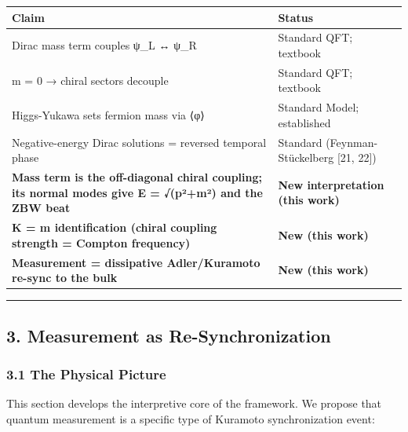 \documentclass[
]{article}
\newcounter{none} %
\begin{document}
{\def\LTcaptype{none} %
\begin{longtable}[]{@{}
  >{\raggedright\arraybackslash}p{}
  >{\raggedright\arraybackslash}p{}@{}}
\toprule\noalign{}
\begin{minipage}[b]{\linewidth}\raggedright
Claim
\end{minipage} & \begin{minipage}[b]{\linewidth}\raggedright
Status
\end{minipage} \\
\midrule\noalign{}
\endhead
\bottomrule\noalign{}
\endlastfoot
Dirac mass term couples ψ\_L ↔ ψ\_R & Standard QFT; textbook \\
m = 0 → chiral sectors decouple & Standard QFT; textbook \\
Higgs-Yukawa sets fermion mass via ⟨φ⟩ & Standard Model; established \\
Negative-energy Dirac solutions = reversed temporal phase & Standard
(Feynman-Stückelberg {[}21, 22{]}) \\
\textbf{Mass term is the off-diagonal chiral coupling; its normal modes
give E = √(p²+m²) and the ZBW beat} & \textbf{New interpretation (this
work)} \\
\textbf{K = m identification (chiral coupling strength = Compton
frequency)} & \textbf{New (this work)} \\
\textbf{Measurement = dissipative Adler/Kuramoto re-sync to the bulk} &
\textbf{New (this work)} \\
\end{longtable}
}

\begin{center}\rule{0.5\linewidth}{0.5pt}\end{center}

\subsection{3. Measurement as
Re-Synchronization}\label{measurement-as-re-synchronization}

\subsubsection{3.1 The Physical Picture}\label{the-physical-picture}

This section develops the interpretive core of the framework. We propose
that quantum measurement is a specific type of Kuramoto synchronization
event:
\end{document}
